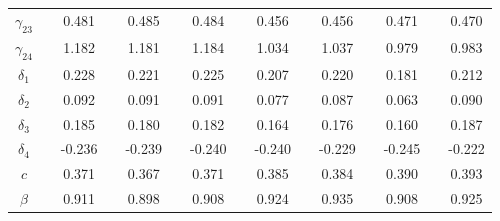 \begin{tabular}{crccccccccccccc}
$\gamma_{23}$ &           & 0.481     &           & 0.485     &           & 0.484     &           & 0.456     &           & 0.456     &           & 0.471     &           & 0.470 \\
$\gamma_{24}$ &           & 1.182     &           & 1.181     &           & 1.184     &           & 1.034     &           & 1.037     &           & 0.979     &           & 0.983 \\
$\delta_{1}$ &           & 0.228     &           & 0.221     &           & 0.225     &           & 0.207     &           & 0.220     &           & 0.181     &           & 0.212 \\
$\delta_{2}$ &           & 0.092     &           & 0.091     &           & 0.091     &           & 0.077     &           & 0.087     &           & 0.063     &           & 0.090 \\
$\delta_{3}$ &           & 0.185     &           & 0.180     &           & 0.182     &           & 0.164     &           & 0.176     &           & 0.160     &           & 0.187 \\
$\delta_{4}$ &           & -0.236    &           & -0.239    &           & -0.240    &           & -0.240    &           & -0.229    &           & -0.245    &           & -0.222 \\
$c$       &           & 0.371     &           & 0.367     &           & 0.371     &           & 0.385     &           & 0.384     &           & 0.390     &           & 0.393 \\
$\beta$   &           & 0.911     &           & 0.898     &           & 0.908     &           & 0.924     &           & 0.935     &           & 0.908     &           & 0.925 \\
\bottomrule
\bottomrule
\end{tabular}%
